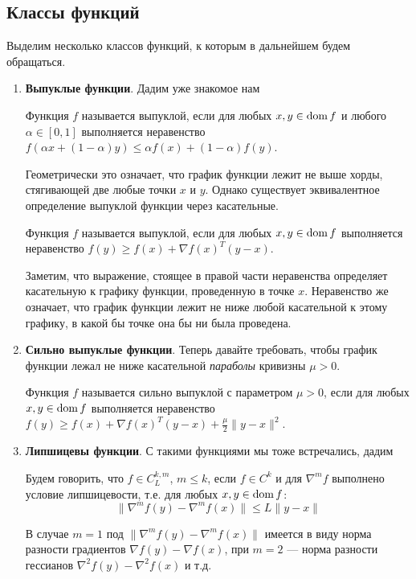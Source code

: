 \documentclass[a4paper, 12pt]{article}
\begin{document}
\subsection{Классы функций}
Выделим несколько классов функций, к которым в дальнейшем будем обращаться.
\begin{enumerate}
    \item \textbf{Выпуклые функции}. Дадим уже знакомое нам
    \begin{Def}
    Функция $f$ называется выпуклой, если для любых $x, y \in \operatorname{\mathop{dom}} f$ и любого $\alpha \in [0, 1]$ выполняется неравенство $f(\alpha x + (1-\alpha) y) \leq \alpha f(x) + (1 - \alpha)f(y)$.
    \end{Def}
    Геометрически это означает, что график функции лежит не выше хорды, стягивающей две любые точки $x$ и $y$. Однако существует эквивалентное определение выпуклой функции через касательные.
    \begin{Def}
    Функция $f$ называется выпуклой, если для любых $x, y \in \operatorname{\mathop{dom}} f$ выполняется неравенство $f(y) \geq f(x) + \nabla f(x)^T (y-x)$.
    \end{Def}
    Заметим, что выражение, стоящее в правой части неравенства определяет касательную к графику функции, проведенную в точке $x$. Неравенство же означает, что график функции лежит не ниже любой касательной к этому графику, в какой бы точке она бы ни была проведена.
    
    \item \textbf{Сильно выпуклые функции}. Теперь давайте требовать, чтобы график функции лежал не ниже касательной \textit{параболы} кривизны $\mu > 0$.
    \begin{Def}
    Функция $f$ называется сильно выпуклой с параметром $\mu > 0$, если для любых $x, y \in \operatorname{\mathop{dom}} f$ выполняется неравенство $f(y) \geq f(x) + \nabla f(x)^T (y-x) + \frac{\mu}{2}\|y - x\|^2$.
    \end{Def}
    
    \item \textbf{Липшицевы функции}. С такими функциями мы тоже встречались, дадим
    \begin{Def}
    Будем говорить, что $f \in C^{k, m}_{L}$, $m \leq k$, если $f \in C^k$ и для $\nabla^m f$ выполнено условие липшицевости, т.е. для любых $x, y \in \operatorname{\mathop{dom}} f$:
    $$\|\nabla^m f(y) - \nabla^m f(x)\| \leq L\|y - x\|$$
    \end{Def}
    \begin{Comment} В случае $m = 1$ под $\|\nabla^m f(y) - \nabla^m f(x)\|$ имеется в виду норма разности градиентов $\nabla f(y) - \nabla f(x)$, при $m=2$ --- норма  разности гессианов $\nabla^2 f(y) - \nabla^2 f(x)$ и т.д.
    \end{Comment}
    

\end{enumerate}
\end{document}
